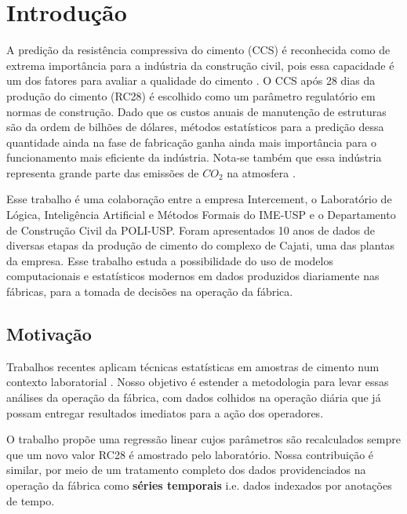 \chapter{Introdução}
\label{cap:introducao}


A predição da resistência compressiva do cimento (CCS) é reconhecida como de
extrema importância para a indústria da construção civil, pois essa
capacidade é um dos fatores para avaliar a qualidade do cimento
\citep{cementml}. O CCS após 28 dias da produção do cimento (RC28) é escolhido
 como um parâmetro regulatório em normas de construção. Dado que os custos
 anuais de manutenção de estruturas são da ordem de bilhões de dólares, métodos
 estatísticos para a predição dessa quantidade ainda na fase de fabricação ganha ainda mais importância para o
 funcionamento mais eficiente da indústria. Nota-se também que essa  
 indústria representa grande parte das emissões de $CO_2$ na atmosfera \citep{cementroadmap}.

Esse trabalho é uma colaboração entre a empresa Intercement, o Laboratório de
Lógica, Inteligência Artificial e Métodos Formais do IME-USP e o Departamento de
Construção Civil da POLI-USP. Foram apresentados
10 anos de dados de diversas etapas da produção de cimento do complexo de
Cajati, uma das plantas da empresa. Esse trabalho estuda a possibilidade do uso
de modelos computacionais e estatísticos modernos em dados produzidos diariamente nas fábricas,
para a tomada de decisões na operação da fábrica.


\section {Motivação}



Trabalhos recentes aplicam técnicas estatísticas em amostras de cimento num
contexto laboratorial \citep{cementlin,nncement}.
Nosso objetivo é estender a metodologia para
levar essas análises da operação da fábrica, com dados colhidos na operação diária que já
possam entregar resultados imediatos para a ação dos operadores.

O trabalho \citep{dynstat} propõe uma regressão linear cujos parâmetros são recalculados
sempre que um novo valor RC28 é amostrado pelo laboratório. Nossa contribuição é
similar, por meio de um tratamento completo dos dados providenciados na operação da fábrica como
\textbf{séries temporais} i.e. dados indexados por anotações de tempo.

